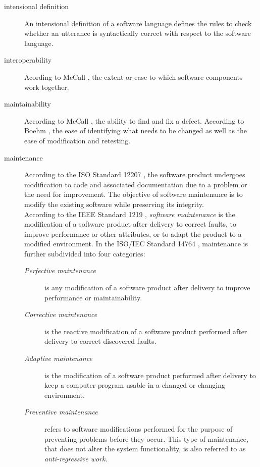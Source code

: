 \documentclass[11pt, oneside]{article}
\begin{document}
\begin{description}

\item[intensional definition]
An intensional definition of a software language defines the rules to check whether an utterance is syntactically correct with respect to the software language.

\item[interoperability]
Acording to McCall \cite{mccall1977factors}, the extent or ease to which software components work together.


\item[maintainability]
According to McCall \cite{mccall1977factors}, the ability to find and fix a defect.
According to Boehm \cite{opac-b1104886}, the ease of identifying what needs to be changed as well as the ease of modification and retesting.

\item[maintenance]
According to the ISO Standard 12207 \cite{ISO1995-12207}, the software product undergoes modification to code and associated documentation due to a problem or the need for improvement. The objective of software maintenance is to modify the existing software while preserving its integrity.\\
According to the IEEE Standard 1219 \cite{IEEE1999-1219}, \emph{software maintenance} is the modification of a software product after delivery to correct faults, to improve performance or other attributes, or to adapt the product to a modified environment.
In the ISO/IEC Standard 14764 \cite{ISO/IEC1999-14764}, maintenance is further subdivided into four categories:
\begin{description}
\item[\emph{Perfective maintenance}] is any modification of a software product after delivery to improve performance or maintainability.
\item[\emph{Corrective maintenance}] is the reactive modification of a software product performed after delivery to correct discovered faults.
\item[\emph{Adaptive maintenance}] is the modification of a software product performed after delivery to keep a computer program usable in a changed or changing environment.
\item[\emph{Preventive maintenance}] refers to software modifications performed for the purpose of preventing problems before they occur. This type of maintenance, that does not alter the system functionality, is also referred to as \emph{anti-regressive work.}
\end{description}


\end{description}
\end{document}
